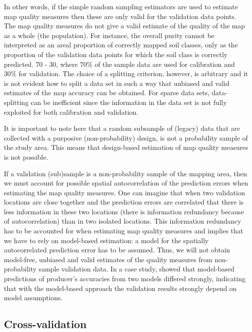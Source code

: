 \documentclass[10pt,b5paper,]{book}
\theoremstyle{definition}
\theoremstyle{definition}
\theoremstyle{definition}
\theoremstyle{remark}
\begin{document}
In other words, if the simple random sampling estimators are used to
estimate map quality measures then these are only valid for the
validation data points. The map quality measures do not give a valid
estimate of the quality of the map as a whole (the population). For
instance, the overall purity cannot be interpreted as an areal
proportion of correctly mapped soil classes, only as the proportion of
the validation data points for which the soil class is correctly
predicted. 70 - 30, where \(70\%\) of the sample data are used for
calibration and \(30\%\) for validation. The choice of a splitting
criterion, however, is arbitrary and it is not evident how to split a
data set in such a way that unbiased and valid estimates of the map
accuracy can be obtained. For sparse data sets, data-splitting can be
inefficient since the information in the data set is not fully exploited
for both calibration and validation.

It is important to note here that a random subsample of (legacy) data
that are collected with a purposive (non-probability) design, is not a
probability sample of the study area. This means that design-based
estimation of map quality measures is not possible.

If a validation (sub)sample is a non-probability sample of the mapping
area, then we must account for possible spatial autocorrelation of the
prediction errors when estimating the map quality measures. One can
imagine that when two validation locations are close together and the
prediction errors are correlated that there is less information in these
two locations (there is information redundancy because of
autocorrelation) than in two isolated locations. This information
redundancy has to be accounted for when estimating map quality measures
and implies that we have to rely on model-based estimation: a model for
the spatially autocorrelated prediction error has to be assumed. Thus,
we will not obtain model-free, unbiased and valid estimates of the
quality measures from non-probability sample validation data. In a case
study, \citet{knotters2013purposive} showed that model-based predictions
of producer's accuracies from two models differed strongly, indicating
that with the model-based approach the validation results strongly
depend on model assumptions.

\hypertarget{xval}{%
\subsection{Cross-validation}\label{xval}}
\end{document}
